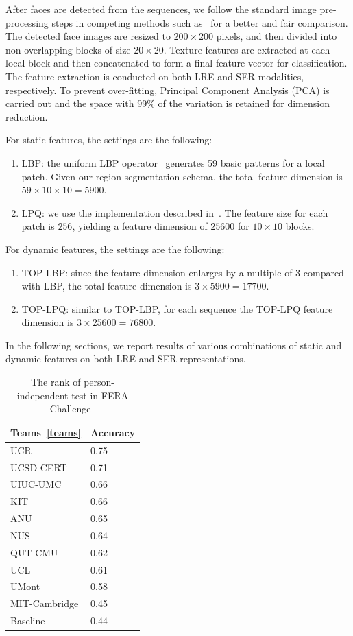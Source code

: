 \documentclass[journal]{IEEEtran}
\begin{document}
After faces are detected from the sequences, we follow the standard image pre-processing steps in competing methods such as~\cite{Valstar12,Yang_SMCB12} for a better and fair comparison. The detected face images are resized to $200\times200$ pixels, and then divided into non-overlapping blocks of size $20\times20$. Texture features are extracted at each local block and then concatenated to form a final feature vector for classification. The feature extraction is conducted on both LRE and SER modalities, respectively. To prevent over-fitting, Principal Component Analysis (PCA) is carried out and the space with $99\%$ of the variation is retained for dimension reduction. 

For static features, the settings are the following:
\begin{enumerate}
\item LBP: the uniform LBP operator~\cite{Ojala_PAMI02} generates 59 basic patterns for a local patch. Given our region segmentation schema, the total feature dimension is $59\times 10\times 10=5900$. 
\item LPQ: we use the implementation described in~\cite{LPQ}. The feature size for each patch is $256$, yielding a feature dimension of $25600$ for $10 \times 10$ blocks. 
\end{enumerate}

For dynamic features, the settings are the following:
\begin{enumerate}
\item TOP-LBP: since the feature dimension enlarges by a multiple of $3$ compared with LBP, the total feature dimension is $3\times 5900=17700$.
\item TOP-LPQ: similar to TOP-LBP, for each sequence the TOP-LPQ feature dimension is $3\times 25600=76800$.  
\end{enumerate} 

In the following sections, we report results of various combinations of static and dynamic features on both LRE and SER representations. 


\begin{table}[!t]
\caption{The rank of person-independent test in FERA Challenge~\cite{Valstar12}\label{table:fera_team}}
\centering
\begin{tabular}{ll}
\toprule
	Teams~\ref{teams} & Accuracy \\ \midrule
	UCR 								& 0.75 \\ 
	UCSD-CERT						& 0.71 \\ 
	UIUC-UMC						& 0.66 \\ 
	KIT									& 0.66 \\ 
	ANU									& 0.65 \\ 
	NUS									& 0.64 \\ 
	QUT-CMU							& 0.62 \\ 
	UCL									& 0.61 \\ 
	UMont								& 0.58 \\ 
	MIT-Cambridge				& 0.45 \\ 
	Baseline						& 0.44 \\
\bottomrule
\end{tabular}
\end{table}
\end{document}
